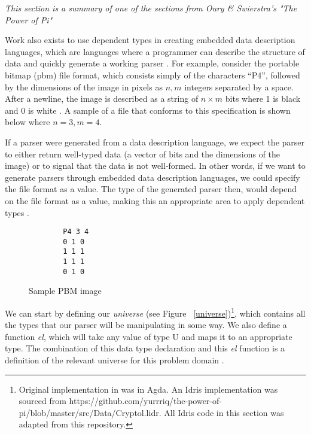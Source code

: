 \textit{This section is a summary of one of the sections from Oury \&
Swierstra's "The Power of Pi" \cite{power_of_pi}}

Work also exists to use dependent types in creating embedded data description
languages, which are languages where a programmer can describe the structure of
data and quickly generate a working parser \cite{power_of_pi}.  For example,
consider the portable bitmap (pbm) file format, which consists simply of the
characters ``P4'', followed by the dimensions of the image in pixels as $n, m$
integers separated by a space. After a newline, the image is described as a
string of $n\times m $ bits where 1 is black and 0 is white \cite{pmb_spec}. A
sample of a file that conforms to this specification is shown below where $n=3,
m=4$. 

If a parser were generated from a data description language, we expect the
parser to either return well-typed data (a vector of bits and the dimensions of
the image) or to signal that the data is not well-formed. In other words, if we
want to generate parsers through embedded data description languages, we could
specify the file format as a value. The type of the generated parser then, would
depend on the file format as a value, making this an appropriate area to apply
dependent types \cite{power_of_pi}. 

\begin{figure}[ht!!!!!!!!!]
    \centering
    \caption{Sample PBM image}
    \label{pbm_sample}
    \begin{lstlisting}
        P4 3 4
        0 1 0
        1 1 1
        1 1 1
        0 1 0
    \end{lstlisting}
\end{figure}

We can start by defining our \textit{universe} (see Figure
~\ref{universe})\footnote{\label{idris_source}Original implementation in
\cite{power_of_pi} was in Agda. An Idris implementation was sourced from
https://github.com/yurrriq/the-power-of-pi/blob/master/src/Data/Cryptol.lidr.
All Idris code in this section was adapted from this repository.}, which
contains all the types that our parser will be manipulating in some way. We also
define a function \textit{el}, which will take any value of type U and maps it
to an appropriate type. The combination of this data type declaration and this
\textit{el} function is a definition of the relevant universe for this problem
domain \cite{power_of_pi}. 

